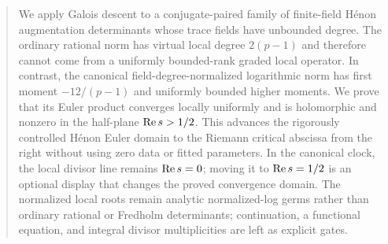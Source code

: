 \begin{abstract}
We apply Galois descent to a conjugate-paired family of finite-field H\'enon
augmentation determinants whose trace fields have unbounded degree.  The
ordinary rational norm has virtual local degree $2(p-1)$ and therefore cannot
come from a uniformly bounded-rank graded local operator.  In contrast, the
canonical field-degree-normalized logarithmic norm has first moment
$-12/(p-1)$ and uniformly bounded higher moments.  We prove that its Euler
product converges locally uniformly and is holomorphic and nonzero in the
half-plane $\RePart s>1/2$.  This advances the rigorously controlled H\'enon
Euler domain to the Riemann critical abscissa from the right without using
zero data or fitted parameters.  In the canonical clock, the local divisor
line remains $\RePart s=0$; moving it to $\RePart s=1/2$ is an optional
display that changes the proved convergence domain.  The normalized local
roots remain analytic normalized-log germs rather than ordinary rational or
Fredholm determinants; continuation, a functional equation, and integral
divisor multiplicities are left as explicit gates.
\end{abstract}
